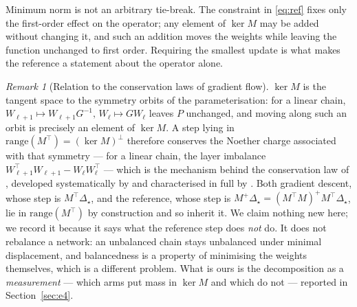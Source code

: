 \documentclass{article} %
\theoremstyle{plain}
\theoremstyle{definition}
\theoremstyle{remark}
\newtheorem{remark}[theorem]{Remark}
\begin{document}
Minimum norm is not an arbitrary tie-break. The constraint in \eqref{eq:ref} fixes only the
first-order effect on the operator; any element of $\ker M$ may be added without changing it, and
such an addition moves the weights while leaving the function unchanged to first order. Requiring
the smallest update is what makes the reference a statement about the operator alone.

\begin{remark}[Relation to the conservation laws of gradient flow]
\label{rem:conserve}
$\ker M$ is the tangent space to the symmetry orbits of the parameterisation: for a linear chain,
$W_{\ell+1} \mapsto W_{\ell+1}G^{-1},\, W_\ell \mapsto G W_\ell$ leaves $P$ unchanged, and moving
along such an orbit is precisely an element of $\ker M$. A step lying in
$\mathrm{range}(M^\top) = (\ker M)^\perp$ therefore conserves the Noether charge associated with
that symmetry --- for a linear chain, the layer imbalance $W_{\ell+1}^\top W_{\ell+1} - W_\ell
W_\ell^\top$ --- which is the mechanism behind the conservation law of \citet{du2018algorithmic},
developed systematically by \citet{kunin2021neural} and characterised in full by
\citet{marcotte2023abide}. Both gradient descent, whose step is $M^\top \Delta_\star$, and the
reference, whose step is $M^{+}\Delta_\star = (M^\top M)^{+}M^\top \Delta_\star$, lie in
$\mathrm{range}(M^\top)$ by construction and so inherit it. We claim nothing new here; we record it
because it says what the reference step does \emph{not} do. It does not rebalance a network: an
unbalanced chain stays unbalanced under minimal displacement, and balancedness is a property of
minimising the weights themselves, which is a different problem. What is ours is the decomposition
as a \emph{measurement} --- which arms put mass in $\ker M$ and which do not --- reported in
Section~\ref{sec:e4}.
\end{remark}
\end{document}
